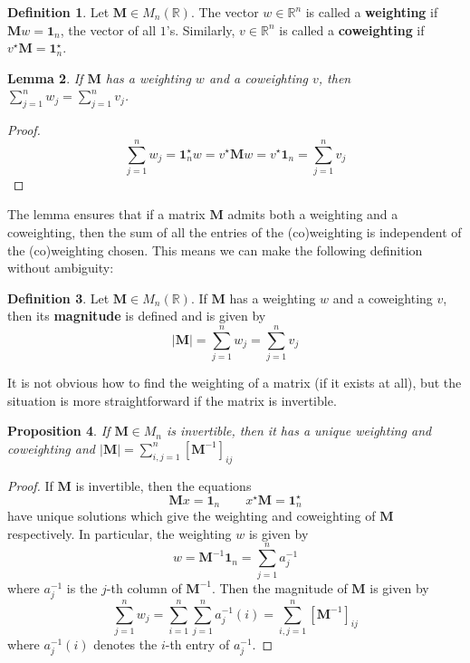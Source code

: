 \documentclass[11pt]{article}
\theoremstyle{definition}
\newtheorem{defn}{Definition}
\theoremstyle{definition}
\theoremstyle{plain}
\theoremstyle{plain}
\newtheorem{prop}[defn]{Proposition}
\theoremstyle{plain}
\newtheorem{lem}[defn]{Lemma}
\theoremstyle{definition}
\begin{document}
\begin{defn}
Let $\mathbf{M} \in M_n(\mathbb{R})$. The vector $w \in \mathbb{R}^n$ is called a \textbf{weighting} if $\mathbf{M}w = \mathbf{1}_n$, the vector of all $1$'s. Similarly, $v \in \mathbb{R}^n$ is called a \textbf{coweighting} if $v^\star\mathbf{M} = \mathbf{1}_n^\star$.
\end{defn}
\begin{lem}
If $\mathbf{M}$ has a weighting $w$ and a coweighting $v$, then $\sum\limits_{j=1}^{n}w_j = \sum\limits_{j=1}^{n}v_j$.
\end{lem}
\begin{proof}
\begin{equation*}
\sum\limits_{j=1}^{n}w_j = \mathbf{1}_n^\star w = v^\star\mathbf{M}w = v^\star \mathbf{1}_n = \sum\limits_{j=1}^{n}v_j
\end{equation*}
\end{proof}
The lemma ensures that if a matrix $\mathbf{M}$ admits both a weighting and a coweighting, then the sum of all the entries of the (co)weighting is independent of the (co)weighting chosen. This means we can make the following definition without ambiguity:
\begin{defn}
Let $\mathbf{M} \in M_n(\mathbb{R})$. If $\mathbf{M}$ has a weighting $w$ and a coweighting $v$, then its \textbf{magnitude} is defined and is given by
\begin{equation*}
\vert \mathbf{M} \vert = \sum\limits_{j=1}^{n} w_j = \sum\limits_{j=1}^{n}v_j
\end{equation*}
\end{defn}
It is not obvious how to find the weighting of a matrix (if it exists at all), but the situation is more straightforward if the matrix is invertible.
\begin{prop}\label{prop:inv}
If $\mathbf{M} \in M_n$ is invertible, then it has a unique weighting and coweighting and $\vert \mathbf{M} \vert = \sum\limits_{i,j=1}^{n}[\mathbf{M}^{-1}]_{ij}$
\end{prop}
\begin{proof}
If $\mathbf{M}$ is invertible, then the equations
\begin{equation*}
\mathbf{M}x = \mathbf{1}_n \qquad x^\star\mathbf{M} = \mathbf{1}_n^\star
\end{equation*}
have unique solutions which give the weighting and coweighting of $\mathbf{M}$ respectively. In particular, the weighting $w$ is given by
\begin{equation*}
w = \mathbf{M}^{-1}\mathbf{1}_n = \sum\limits_{j=1}^{n} a_j^{-1}
\end{equation*}
where $a_j^{-1}$ is the $j$-th column of $\mathbf{M}^{-1}$. Then the magnitude of $\mathbf{M}$ is given by
\begin{equation*}
\sum\limits_{j=1}^{n}w_j = \sum\limits_{i=1}^{n}\sum\limits_{j=1}^{n}a_{j}^{-1}(i) = \sum\limits_{i,j=1}^{n}[\mathbf{M}^{-1}]_{ij}
\end{equation*}
where $a_{j}^{-1}(i)$ denotes the $i$-th entry of $a_j^{-1}$.
\end{proof}
\end{document}

